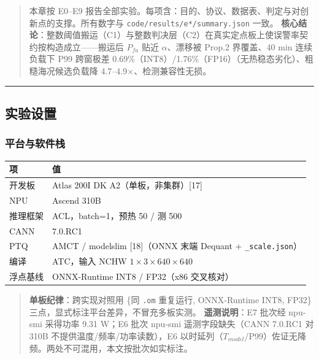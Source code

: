 \begin{quote}
本章按 E0--E9
报告全部实验。每项含：目的、协议、数据表、判定与对创新点的支撑。所有数字与
\texttt{code/results/e*/summary.json} 一致。
\textbf{核心结论}：整数阈值搬运（C1）与整数判决层（C2）在真实定点板上使误警率契约按构造成立------搬运后
\(P_{fa}\) 贴近 \(\alpha\)、漂移被 Prop.2 界覆盖、40 min 连续负载下 P99
跨窗极差
0.69\%（INT8）/1.76\%（FP16）（无热稳态劣化）、粗糙海况候选负载降
4.7--4.9×、检测兼容性无损。
\end{quote}

\begin{center}\rule{0.5\linewidth}{0.5pt}\end{center}

\subsection{实验设置}\label{ux5b9eux9a8cux8bbeux7f6e}

\subsubsection{平台与软件栈}\label{ux5e73ux53f0ux4e0eux8f6fux4ef6ux6808}

{\def\LTcaptype{none} %
\begin{longtable}[]{@{}ll@{}}
\toprule\noalign{}
项 & 值 \\
\midrule\noalign{}
\endhead
\bottomrule\noalign{}
\endlastfoot
开发板 & Atlas 200I DK A2（单板，非集群）{[}17{]} \\
NPU & Ascend 310B \\
推理框架 & ACL，batch=1，预热 50 / 测 500 \\
CANN & 7.0.RC1 \\
PTQ & AMCT / modelslim {[}18{]}（ONNX 末端 Dequant +
\texttt{\_scale.json}） \\
编译 & ATC，输入 NCHW \(1{\times}3{\times}640{\times}640\) \\
浮点基线 & ONNX-Runtime INT8 / FP32（x86 交叉核对） \\
\end{longtable}
}

\begin{quote}
\textbf{单板纪律}：跨实现对照用 \{同 \texttt{.om} 重复运行, ONNX-Runtime
INT8, FP32\} 三点，显式标注平台差异，不冒充多板实测。
\textbf{遥测说明}：E7 批次经 npu-smi 采得功率 9.31 W；E6 批次 npu-smi
遥测字段缺失（CANN 7.0.RC1 对 310B 不提供温度/频率/功率读数），E6
以时延列（\(T_{model}\)/P99）佐证无降频。两处不可混用，本文按批次如实标注。
\end{quote}

